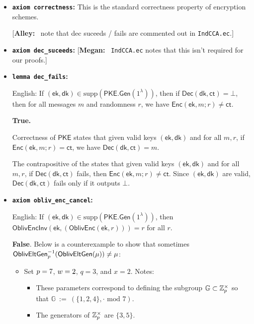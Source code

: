 \documentclass[11pt,letterpaper]{article}
\newcommand{\authnote}[2]{[{\color{red}\textbf{#1:}}~{\color{blue} #2}]}
\newcommand{\authnote}[2]{}
\newcommand{\alley}[1]{\authnote{Alley}{#1}}
\newcommand{\megan}[1]{\authnote{Megan}{#1}}
\theoremstyle{plain} %
\theoremstyle{definition} %
\theoremstyle{remark} %
\newcommand{\code}[1]{\texttt{#1}} %
\newcommand{\eqdef}{\ {:=} \ }
\newcommand{\supp}{\textrm{supp}} %
\newcommand{\SecParam}{\lambda}
\newcommand{\PKE}{\mathsf{PKE}}
\newcommand{\Gen}{\mathsf{Gen}}
\newcommand{\Enc}{\mathsf{Enc}}
\newcommand{\OblivEnc}{\mathsf{OblivEnc}}
\newcommand{\OblivEncInv}{\mathsf{OblivEncInv}}
\newcommand{\Dec}{\mathsf{Dec}}
\newcommand{\EncKey}{\mathsf{ek}}
\newcommand{\DecKey}{\mathsf{dk}}
\newcommand{\Msg}{m}
\newcommand{\Ct}{\mathsf{ct}}
\newcommand{\Rand}{r}
\newcommand{\Integers}{\mathbb{Z}}
\newcommand{\Group}{\mathbb{G}}
\newcommand{\GrpOrd}{q}
\begin{document}
\renewcommand{\mod}{\textrm{ mod }}
\begin{itemize}
\item \textbf{\code{axiom correctness}:} This is the standard correctness property of encryption schemes.

\alley{note that dec suceeds / fails are commented out in \code{IndCCA.ec}.}
\item \textbf{\code{axiom dec\_suceeds}:} \megan{\code{IndCCA.ec} notes that this isn't required for our proofs.}

\item \textbf{\code{lemma dec\_fails}:}

English: If $(\EncKey, \DecKey)\in \supp(\PKE.\Gen(1^{\SecParam}))$, then if $\Dec(\DecKey, \Ct) = \bot$, then for all messages $\Msg$ and randomness $\Rand$, we have $\Enc(\EncKey, \Msg; \Rand) \ne \Ct$.

\textbf{True.}

Correctness of $\PKE$ states that given valid keys $(\EncKey, \DecKey)$ and for all $\Msg, \Rand$, if $\Enc(\EncKey, \Msg; \Rand) = \Ct$, we have $\Dec(\DecKey, \Ct) = \Msg$.

The contrapositive of the states that given valid keys $(\EncKey, \DecKey)$ and for all $\Msg, \Rand$, if $\Dec(\DecKey, \Ct)$ fails, then $\Enc(\EncKey, \Msg; \Rand) \ne \Ct$. Since $(\EncKey, \DecKey)$ are valid, $\Dec(\DecKey, \Ct)$ fails only if it outputs $\bot$.


\item \textbf{\code{axiom obliv\_enc\_cancel}:}

English: If $(\EncKey, \DecKey)\in \supp(\PKE.\Gen(1^{\SecParam}))$, then $\OblivEncInv(\EncKey, (\OblivEnc(\EncKey, \Rand))) = \Rand$ for all $\Rand$.

\textbf{\color{red}False}. Below is a counterexample to show that sometimes ${\mathsf{OblivEltGen}}^{-1}_{p}(\mathsf{OblivEltGen}(\mu)) \ne \mu$:
\begin{itemize}[nolistsep]
    \item Set $p = 7$, $w = 2$, $\GrpOrd = 3$, and $x = 2$. Notes:
    \begin{itemize}[nolistsep]
        \item These parameters correspond to defining the subgroup $\Group \subset \MultGrp$ so that $\Group \eqdef (\{1,2,4\}, \cdot \mod 7)$.
        \item The generators of $\MultGrp$ are $\{3,5\}$.
    \end{itemize}


\end{itemize}
\end{itemize}
\end{document}
